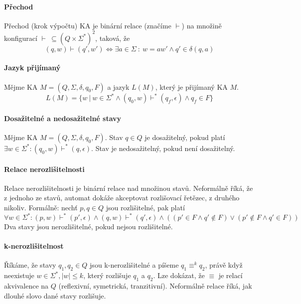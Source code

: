 \paragraph*{Přechod} Přechod (krok výpočtu) KA je binární relace (značíme $\vdash$) na množině konfigurací $\vdash ~ \subseteq (Q \times \Sigma^*)^2$, taková, že $$(q, w) \vdash (q', w') \Leftrightarrow \exists a \in \Sigma ~:~ w = aw' \land q' \in \delta(q, a) $$


\paragraph*{Jazyk přijímaný} Mějme KA $M = (Q, \Sigma, \delta, q_0, F)$ a jazyk $L(M)$, který je přijímaný KA $M$. $$ L(M) = \{ w ~|~ w \in \Sigma^* \land (q_0, w) \vdash^* (q_f, \epsilon) \land q_f \in F \}$$

\paragraph*{Dosažitelné a nedosažitelné stavy} Mějme KA $M = (Q, \Sigma, \delta, q_0, F)$. Stav $q \in Q$ je dosažitelný, pokud platí $\exists w \in \Sigma^* : (q_0, w) \vdash^* (q, \epsilon)$. Stav je nedosažitelný, pokud není dosažitelný.

\paragraph*{Relace nerozlišitelnosti} Relace nerozlišitelnosti je binární relace nad množinou stavů. Neformálně říká, že z jednoho ze stavů, automat dokáže akceptovat rozlišovací řetězec, z druhého nikoliv. Formálně: nechť $p, q \in Q$ jsou rozlišitelné, pak platí $$ \forall w \in \Sigma^* : (p, w) \vdash^* (p', \epsilon) \land (q, w) \vdash^* (q', \epsilon) \land ( (p' \in F \land q' \not\in F) \lor (p' \not\in F \land q' \in F) ) $$ Dva stavy jsou nerozlišitelné, pokud nejsou rozlišitelné.

\paragraph*{k-nerozlišitelnost} Říkáme, že stavy $q_1, q_2 \in Q$ jsou k-nerozlišitelné a píšeme $q_1 \equiv^k q_2$, právě když neexistuje $w \in \Sigma^*, |w| \leq k$, který rozlišuje $q_1$ a $q_2$. Lze dokázat, že $\equiv$ je relací akvivalence na $Q$ (reflexivní, symetrická, tranzitivní). Neformálně relace říká, jak dlouhé slovo dané stavy rozlišuje.


